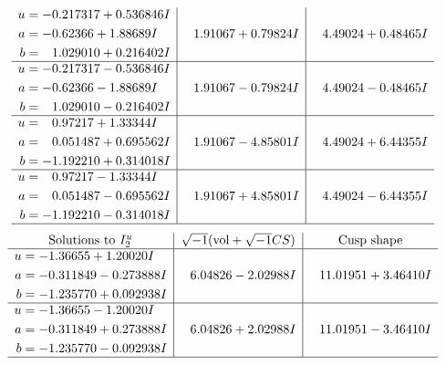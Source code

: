 \documentclass[1p]{elsarticle_modified}
\theoremstyle{definition}
\newcommand{\I}{\sqrt{-1}}
\begin{document}
$$\begin{array}{c|c|c}
\begin{aligned}
u &= -0.217317 + 0.536846 I \\
a &= -0.62366 + 1.88689 I \\
b &= \phantom{-}1.029010 + 0.216402 I\end{aligned}
 & \phantom{-}1.91067 + 0.79824 I & \phantom{-}4.49024 + 0.48465 I \\ \hline\begin{aligned}
u &= -0.217317 - 0.536846 I \\
a &= -0.62366 - 1.88689 I \\
b &= \phantom{-}1.029010 - 0.216402 I\end{aligned}
 & \phantom{-}1.91067 - 0.79824 I & \phantom{-}4.49024 - 0.48465 I \\ \hline\begin{aligned}
u &= \phantom{-}0.97217 + 1.33344 I \\
a &= \phantom{-}0.051487 + 0.695562 I \\
b &= -1.192210 + 0.314018 I\end{aligned}
 & \phantom{-}1.91067 - 4.85801 I & \phantom{-}4.49024 + 6.44355 I \\ \hline\begin{aligned}
u &= \phantom{-}0.97217 - 1.33344 I \\
a &= \phantom{-}0.051487 - 0.695562 I \\
b &= -1.192210 - 0.314018 I\end{aligned}
 & \phantom{-}1.91067 + 4.85801 I & \phantom{-}4.49024 - 6.44355 I\\
 \hline 
 \end{array}$$\newpage$$\begin{array}{c|c|c}  
\text{Solutions to }I^u_{2}& \I (\text{vol} + \sqrt{-1}CS) & \text{Cusp shape}\\
 \hline 
\begin{aligned}
u &= -1.36655 + 1.20020 I \\
a &= -0.311849 - 0.273888 I \\
b &= -1.235770 + 0.092938 I\end{aligned}
 & \phantom{-}6.04826 - 2.02988 I & \phantom{-}11.01951 + 3.46410 I \\ \hline\begin{aligned}
u &= -1.36655 - 1.20020 I \\
a &= -0.311849 + 0.273888 I \\
b &= -1.235770 - 0.092938 I\end{aligned}
 & \phantom{-}6.04826 + 2.02988 I & \phantom{-}11.01951 - 3.46410 I\\
 \hline 
 \end{array}$$\newpage
\end{document}
